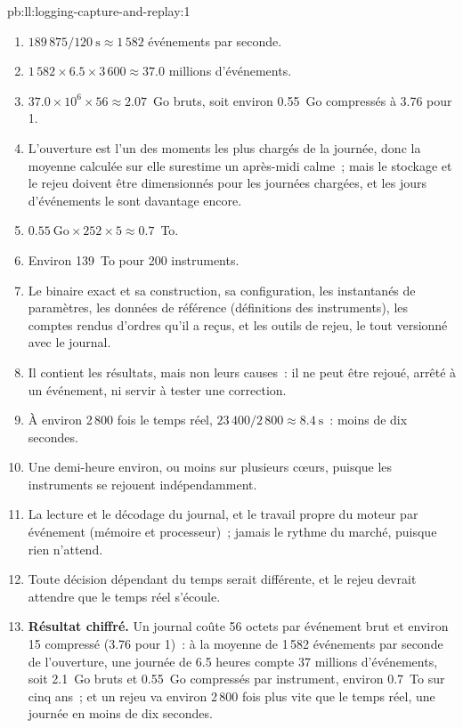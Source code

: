 \begin{solution}{pb:ll:logging-capture-and-replay:1}
\begin{enumerate}
\item $189\,875 / \qty{120}{\second} \approx 1\,582$ événements par seconde.
\item $1\,582 \times 6.5 \times 3\,600 \approx 37.0$ millions d'événements.
\item $37.0 \times 10^6 \times 56 \approx 2.07$~Go bruts, soit environ 0.55~Go compressés à 3.76 pour 1.
\item L'ouverture est l'un des moments les plus chargés de la journée, donc la moyenne calculée sur elle surestime un après-midi calme~; mais le stockage et
le rejeu doivent être dimensionnés pour les journées chargées, et les jours d'événements le sont davantage encore.
\item $0.55~\text{Go} \times 252 \times 5 \approx 0.7$~To.
\item Environ 139~To pour 200 instruments.
\item Le binaire exact et sa construction, sa configuration, les instantanés de paramètres, les données de référence (définitions des instruments),
les comptes rendus d'ordres qu'il a reçus, et les outils de rejeu, le tout versionné avec le journal.
\item Il contient les résultats, mais non leurs causes~: il ne peut être rejoué, arrêté à un événement, ni servir à tester une correction.
\item À environ 2\,800 fois le temps réel, $23\,400 / 2\,800 \approx \qty{8.4}{\second}$~: moins de dix secondes.
\item Une demi-heure environ, ou moins sur plusieurs cœurs, puisque les instruments se rejouent indépendamment.
\item La lecture et le décodage du journal, et le travail propre du moteur par événement (mémoire et processeur)~; jamais le rythme du marché,
puisque rien n'attend.
\item Toute décision dépendant du temps serait différente, et le rejeu devrait attendre que le temps réel s'écoule.
\item \textbf{Résultat chiffré.} Un journal coûte 56 octets par événement brut et environ 15 compressé (3.76 pour 1)~: à la moyenne de 1\,582 événements
par seconde de l'ouverture, une journée de 6.5 heures compte 37 millions d'événements, soit 2.1~Go bruts et 0.55~Go compressés par instrument, environ
0.7~To sur cinq ans~; et un rejeu va environ 2\,800 fois plus vite que le temps réel, une journée en moins de dix secondes.

\end{enumerate}
\end{solution}
